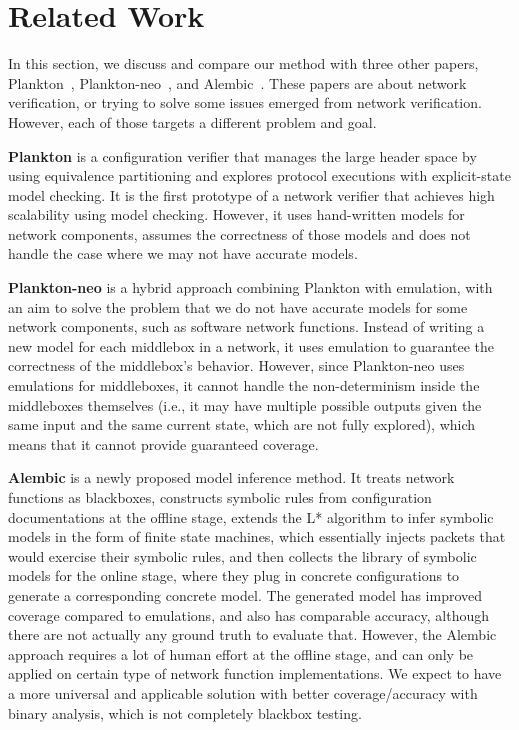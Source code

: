 \section{Related Work}

In this section, we discuss and compare our method with three other papers,
Plankton~\cite{2020-PrabhuEtAl}, Plankton-neo~\cite{2018-PrabhuEtAl}, and
Alembic~\cite{2019-MoonEtAl}. These papers are about network verification, or
trying to solve some issues emerged from network verification. However, each of
those targets a different problem and goal.

\textbf{Plankton} is a configuration verifier that manages the large header
space by using equivalence partitioning and explores protocol executions with
explicit-state model checking. It is the first prototype of a network verifier
that achieves high scalability using model checking. However, it uses
hand-written models for network components, assumes the correctness of those
models and does not handle the case where we may not have accurate models.

\textbf{Plankton-neo} is a hybrid approach combining Plankton with emulation,
with an aim to solve the problem that we do not have accurate models for some
network components, such as software network functions. Instead of writing a new
model for each middlebox in a network, it uses emulation to guarantee the
correctness of the middlebox's behavior. However, since Plankton-neo uses
emulations for middleboxes, it cannot handle the non-determinism inside the
middleboxes themselves (i.e., it may have multiple possible outputs given the
same input and the same current state, which are not fully explored), which
means that it cannot provide guaranteed coverage.

\textbf{Alembic} is a newly proposed model inference method. It treats network
functions as blackboxes, constructs symbolic rules from configuration
documentations at the offline stage, extends the L* algorithm to infer symbolic
models in the form of finite state machines, which essentially injects packets
that would exercise their symbolic rules, and then collects the library of
symbolic models for the online stage, where they plug in concrete configurations
to generate a corresponding concrete model. The generated model has improved
coverage compared to emulations, and also has comparable accuracy, although
there are not actually any ground truth to evaluate that. However, the Alembic
approach requires a lot of human effort at the offline stage, and can only be
applied on certain type of network function implementations. We expect to have a
more universal and applicable solution with better coverage/accuracy with binary
analysis, which is not completely blackbox testing.


